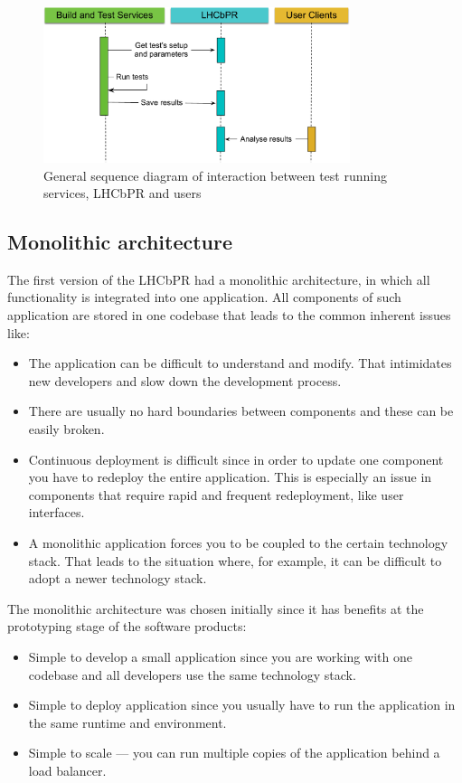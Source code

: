\documentclass[10pt]{iopart}
\begin{document}
\begin{figure}[H]
\begin{minipage}{\textwidth}
\centering
\includegraphics[width=0.8\textwidth]{figs/lhcbpr-general.pdf}
\caption{\label{fig01} General sequence diagram of interaction between test
running services, LHCbPR and users}
\end{minipage}
\end{figure}

\subsection{Monolithic architecture}
The first version of the LHCbPR had a monolithic architecture, in which all
functionality is integrated into one application. All components of
such application are stored in one codebase that leads to the common inherent
issues like:
\begin{itemize}
\item The application can be difficult to understand and modify. That
intimidates new developers and slow down the development process.
\item There are usually no hard boundaries between components and these can be
easily broken.
\item Continuous deployment is difficult since in order to update one component
you have to redeploy the entire application. This is especially an issue in
components that require rapid and frequent redeployment, like user interfaces.
\item A monolithic application forces you to be coupled to the certain
technology stack. That leads to the situation where, for example, it can be
difficult to adopt a newer technology stack.
\end{itemize}

The monolithic architecture was chosen initially since it has benefits at the
prototyping stage of the software products:
\begin{itemize}
\item Simple to develop a small application since you are working with one codebase
and all developers use the same technology stack.  
\item Simple to deploy application since you usually have to run the application in the same
runtime and environment.
\item Simple to scale --- you can run multiple copies of the application behind a
load balancer.
\end{itemize}
\end{document}
